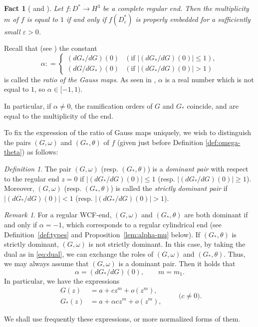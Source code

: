 \documentclass[a4paper]{amsart}
\theoremstyle{plain}
\newtheorem{fact}[theorem]{Fact}
\theoremstyle{remark}
\newtheorem{definition}[theorem]{Definition}
\newtheorem{remark}[theorem]{Remark}
\numberwithin{equation}{section}
\begin{document}
\begin{fact}[\cite{GMM} and \cite{KUY2}]
 Let $f:D^*\to H^3$ be a complete regular end.
 Then the multiplicity $m$ of $f$ is equal to $1$
 if and only if $f(D_{\varepsilon}^*)$ 
 is properly embedded for a sufficiently small $\varepsilon>0$.
\end{fact}

Recall that (see \cite[(7.1)]{KRUY}) the constant 
\begin{equation}\label{eq:gauss-ratio}
\alpha: = \begin{cases}
    (dG_*/dG)(0) & (\text{if $|(dG_*/dG)(0)|\le 1$}), \\
    (dG/dG_*)(0) & (\text{if $|(dG_*/dG)(0)|>1$})
   \end{cases}  
\end{equation}
is called the {\it ratio of the Gauss maps}.
As seen in \cite[Propositions 3.1 and 7.3]{KRUY},
$\alpha$ is a real number which is not equal to $1$, 
so $\alpha\in [-1,1)$.

In particular, if $\alpha\neq 0$, the ramification orders of $G$ and
$G_*$ coincide, and are equal to the multiplicity of the end.

To fix the expression of the ratio of Gauss maps uniquely, 
we wish to distinguish the pairs $(G,\omega)$ and $(G_*,\theta)$
of $f$
(given just before Definition \ref{def:omega-theta})
as follows:
\begin{definition}
 The pair $(G,\omega)$ {\rm (}resp. $(G_*,\theta)${\rm)}
 is  a {\it dominant pair\/}
 with respect to the regular end $z=0$ if
 $|(dG_*/dG)(0)|\le 1$ {\rm(}resp. $|(dG_*/dG)(0)|\ge 1${\rm)}.
 Moreover, $(G,\omega)$ {\rm (}resp. $(G_*,\theta)${\rm )} is called
 the {\it strictly dominant pair\/} if $|(dG_*/dG)(0)|< 1$ 
 {\rm (}resp. $|(dG_*/dG)(0)|> 1${\rm)}.
\end{definition}
\begin{remark}\label{rem:dominant-pair}
 For a regular WCF-end,
 $(G,\omega)$ and $(G_*,\theta)$
 are both dominant if and only if $\alpha=-1$, 
 which corresponds to a regular cylindrical end 
 (see Definition~\ref{def:types} and Proposition~\ref{lem:alpha-mu} below).
 If $(G_*,\theta)$ is strictly dominant, $(G,\omega)$ is not strictly dominant. 
 In this case, by taking the dual as in  \eqref{eq:dual}, 
 we can exchange the roles of $(G,\omega)$ and $(G_*,\theta)$.
 Thus, we may always assume that $(G,\omega)$ is a dominant pair.
 Then it holds that
 \begin{equation}\label{eq:remark_new}
     \alpha=(dG_*/dG)(0),\qquad m=m_1.
 \end{equation}
 In particular, we have the
 expressions
 \begin{equation}\label{eq:gauss-normal}
  \begin{aligned}
     G(z)&=a+c z^m+o(z^m), \\
     G_*(z)&=a+\alpha c z^m+o(z^m),
  \end{aligned}
   \qquad \bigl(c\ne 0 \bigr).
 \end{equation}
\end{remark}
We shall use frequently these expressions, or more normalized forms of
them.
\end{document}
